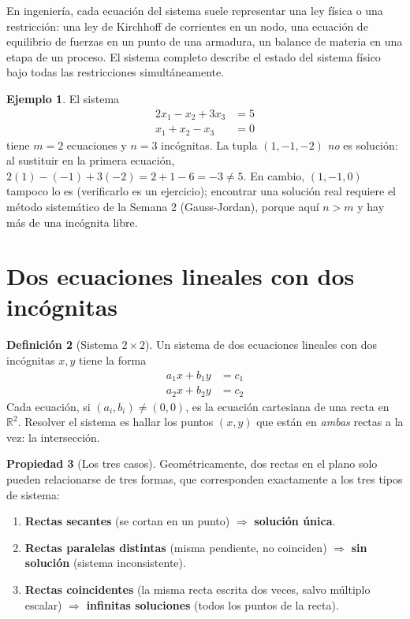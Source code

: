 \documentclass[11pt,letterpaper]{article}
\theoremstyle{definition}
\newtheorem{definicion}{Definición}[section]
\newtheorem{ejemplo}[definicion]{Ejemplo}
\newtheorem{propiedad}[definicion]{Propiedad}
\newcommand{\R}{\mathbb{R}}
\begin{document}
En ingeniería, cada ecuación del sistema suele representar una ley física o una restricción: una
ley de Kirchhoff de corrientes en un nodo, una ecuación de equilibrio de fuerzas en un punto de
una armadura, un balance de materia en una etapa de un proceso. El sistema completo describe el
estado del sistema físico bajo todas las restricciones simultáneamente.

\begin{ejemplo}
El sistema
\[
\begin{aligned}
  2x_1 - x_2 + 3x_3 &= 5 \\
  x_1 + x_2 - x_3 &= 0
\end{aligned}
\]
tiene $m=2$ ecuaciones y $n=3$ incógnitas. La tupla $(1,-1,-2)$ \emph{no} es solución: al
sustituir en la primera ecuación, $2(1)-(-1)+3(-2) = 2+1-6=-3 \neq 5$. En cambio, $(1,-1,0)$
tampoco lo es (verificarlo es un ejercicio); encontrar una solución real requiere el método
sistemático de la Semana 2 (Gauss-Jordan), porque aquí $n>m$ y hay más de una incógnita libre.
\end{ejemplo}

\section{Dos ecuaciones lineales con dos incógnitas}

\begin{definicion}[Sistema $2\times 2$]
Un sistema de dos ecuaciones lineales con dos incógnitas $x,y$ tiene la forma
\[
\begin{aligned}
  a_1 x + b_1 y &= c_1 \\
  a_2 x + b_2 y &= c_2
\end{aligned}
\]
Cada ecuación, si $(a_i,b_i)\neq(0,0)$, es la ecuación cartesiana de una recta en $\R^2$. Resolver
el sistema es hallar los puntos $(x,y)$ que están en \emph{ambas} rectas a la vez: la intersección.
\end{definicion}

\begin{propiedad}[Los tres casos]
Geométricamente, dos rectas en el plano solo pueden relacionarse de tres formas, que corresponden
exactamente a los tres tipos de sistema:
\begin{enumerate}[label=(\alph*)]
  \item \textbf{Rectas secantes} (se cortan en un punto) $\Rightarrow$ \textbf{solución única}.
  \item \textbf{Rectas paralelas distintas} (misma pendiente, no coinciden) $\Rightarrow$
        \textbf{sin solución} (sistema inconsistente).
  \item \textbf{Rectas coincidentes} (la misma recta escrita dos veces, salvo múltiplo escalar)
        $\Rightarrow$ \textbf{infinitas soluciones} (todos los puntos de la recta).
\end{enumerate}
\end{propiedad}
\end{document}
